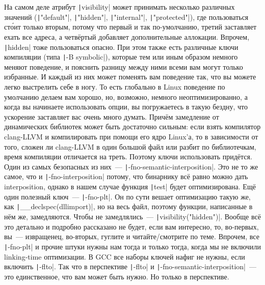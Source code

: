 \documentclass{article}
\begin{document}
    На самом деле атрибут \texttt|visibility| может принимать несколько различных значений (\texttt|"default"|, \texttt|"hidden"|, \texttt|"internal"|, \texttt|"protected"|), где пользоваться ст\'{о}ит только вторым, потому что первый и так по-умолчанию, третий заставляет ехать все адреса, а четвёртый добавляет дополнительные аллокации. Впрочем, \texttt|hidden| тоже пользоваться опасно. При этом также есть различные ключи компиляции (типа \texttt|-B symbolic|), которые тем или иным образом немного меняют поведение, и пояснить разницу между ними всеми вам могут только избранные. И каждый из них может поменять вам поведение так, что вы можете легко выстрелить себе в ногу. То есть глобально в Linux поведение по умолчанию делаем вам хорошо, но, возможно, немного неоптимизированно, а когда вы начинаете использовать опции, вы погружаетесь в такую бездну, что ускорение заставляет вас очень много думать. Причём замедление от динамических библиотек может быть достаточно сильным: если взять компилятор clang-LLVM и компилировать при помощи его ядро Linux'а, то в зависимости от того, сложен ли clang-LLVM в один большой файл или разбит по библиотечкам, время компиляции отличается на треть. Поэтому ключи использовать придётся. Один из самых безопасных из них~--- \texttt|-fno-semantic-interposition|. Это не то же самое, что и \texttt|-fno-interposition| потому, что бинарнику всё равно можно дать interposition, однако в нашем случае функция \texttt|test| будет оптимизирована. Ещё один полезный ключ~--- \texttt|-fno-plt|. Он по сути вешает оптимизацию такую же, как \texttt|__declspec(dllimport)|, но на весь файл, поэтому функции, написанные в нём же, замедляются. Чтобы не замедлялись~--- \texttt|visibility("hidden")|. Вообще всё это детально и подробно рассказано не будет, если вам интересно, то, во-первых, вы~--- извращенец, во-вторых, гуглите и читайте/смотрите по теме. Впрочем, все \texttt|-fno-plt| и прочие штуки нужны нам тогда и только тогда, когда мы не включили linking-time оптимизации. В GCC все наборы ключей нафиг не нужны, если включить \texttt|-flto|. Так что в перспективе \texttt|-flto| и \texttt|-fno-semantic-interposition|~--- это единственное, что вам может быть нужно. Но только в перспективе.
\end{document}

